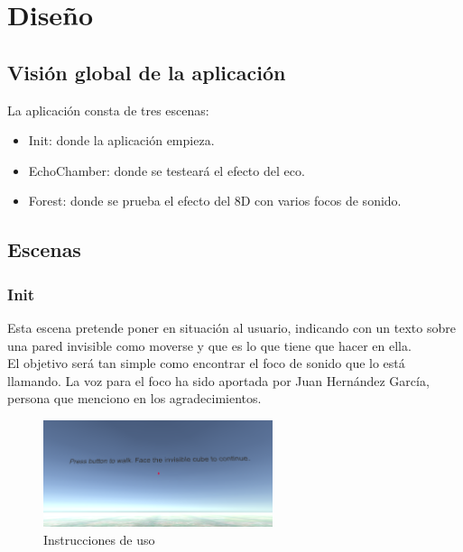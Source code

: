 \section{Diseño}

\subsection{Visión global de la aplicación}

\quad La aplicación consta de tres escenas:\\

\begin{itemize}
	\item Init: donde la aplicación empieza.
	\item EchoChamber: donde se testeará el efecto del eco.
	\item Forest: donde se prueba el efecto del 8D con varios focos de sonido.
\end{itemize}

\subsection{Escenas}
	\subsubsection{Init}
\quad Esta escena pretende poner en situación al usuario, indicando con un texto sobre una pared invisible como moverse y que es lo que tiene que hacer en ella.\\

\quad El objetivo será tan simple como encontrar el foco de sonido que lo está llamando. La voz para el foco ha sido aportada por Juan Hernández García, persona que menciono en los agradecimientos.\\

\begin{figure}[htb]
	\centering
	\includegraphics[width=0.6\textwidth]{./imagenes/initInstructions}
	\caption{Instrucciones de uso}
\end{figure} 

